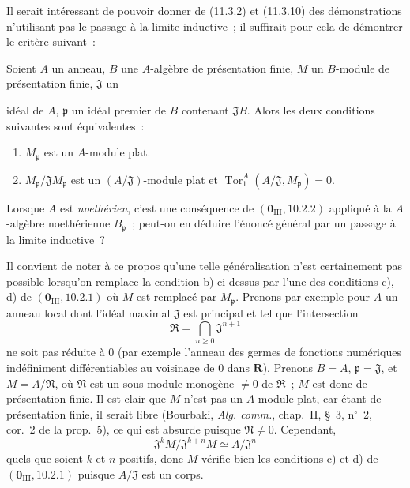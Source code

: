 \begin{remark}[11.3.12]
\label{IV.11.3.12-fr}
Il serait intéressant de pouvoir donner de (11.3.2) et (11.3.10) des
démonstrations n'utilisant pas le passage à la limite inductive~; il suffirait
pour cela de démontrer le critère suivant~:

Soient $A$ un anneau, $B$ une $A$-algèbre de présentation finie, $M$ un
$B$-module de présentation finie, $\mathfrak J$ un


idéal de $A$, $\mathfrak p$ un idéal premier de $B$ contenant $\mathfrak JB$.
Alors les deux conditions suivantes sont équivalentes~:
\begin{enumerate}[label=\emph{\alph*)}]
\item $M_\mathfrak p$ est un $A$-module plat.
\item $M_\mathfrak p/\mathfrak JM_\mathfrak p$ est un
$(A/\mathfrak J)$-module plat et
$\operatorname{Tor}_1^A(A/\mathfrak J,M_\mathfrak p)=0$.
\end{enumerate}
Lorsque $A$ est \emph{noethérien}, c'est une conséquence de
$(\mathbf 0_{\mathrm{III}},10.2.2)$ appliqué à la $A$-algèbre noethérienne
$B_\mathfrak p$~; peut-on en déduire l'énoncé général par un passage à la
limite inductive~?

Il convient de noter à ce propos qu'une telle généralisation n'est certainement
pas possible lorsqu'on remplace la condition b) ci-dessus par l'une des
conditions c), d) de $(\mathbf 0_{\mathrm{III}},10.2.1)$ où $M$ est remplacé
par $M_\mathfrak p$. Prenons par exemple pour $A$ un anneau local dont l'idéal
maximal $\mathfrak J$ est principal et tel que l'intersection
\[
\mathfrak R=\bigcap_{n\geq0}\mathfrak J^{n+1}
\]
ne soit pas réduite à $0$ (par exemple l'anneau des germes de fonctions
numériques indéfiniment différentiables au voisinage de $0$ dans $\mathbf R$).
Prenons $B=A$, $\mathfrak p=\mathfrak J$, et $M=A/\mathfrak N$, où
$\mathfrak N$ est un sous-module monogène $\neq0$ de $\mathfrak R$~; $M$ est
donc de présentation finie. Il est clair que $M$ n'est pas un $A$-module plat,
car étant de présentation finie, il serait libre (Bourbaki, \emph{Alg. comm.},
chap.~II, \S~3, n$^\circ$~2, cor.~2 de la prop.~5), ce qui est absurde puisque
$\mathfrak N\neq0$. Cependant,
\[
\mathfrak J^kM/\mathfrak J^{k+n}M\simeq A/\mathfrak J^n
\]
quels que soient $k$ et $n$ positifs, donc $M$ vérifie bien les conditions c)
et d) de $(\mathbf 0_{\mathrm{III}},10.2.1)$ puisque $A/\mathfrak J$ est un
corps.
\end{remark}
